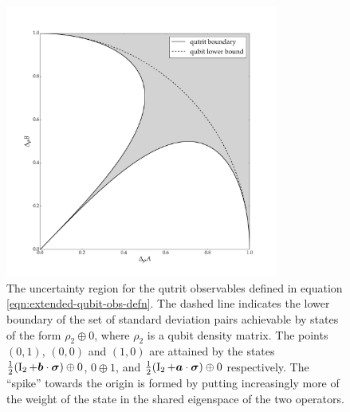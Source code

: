 \begin{center}
  \begin{figure}[ht]
    \centering
    \includegraphics[width=0.8\textwidth]{figs/extended-qubit-error-region-bw}
    \caption[The uncertainty region for the qutrit observables defined in equation \eqref{eqn:extended-qubit-obs-defn}]{The uncertainty region for the qutrit observables defined in equation \eqref{eqn:extended-qubit-obs-defn}. The dashed line indicates the lower boundary of the set of standard deviation pairs achievable by states of the form $\rho_2 \oplus 0$, where $\rho_2$ is a qubit density matrix. The points $(0,1)$, $(0,0)$ and $(1,0)$ are attained by the states $\frac{1}{2}(\operatorname{I}_2+\bm{b}\cdot{\boldsymbol\sigma})\oplus 0$, $0\oplus 1$, and $\frac{1}{2}(\operatorname{I}_2+\bm{a}\cdot{\boldsymbol\sigma})\oplus 0$ respectively. The ``spike'' towards the origin is formed by putting increasingly more of the weight of the state in the shared eigenspace of the two operators.}
    \label{fig:extended-qubit-uncertainty-region}
  \end{figure}
\end{center}

